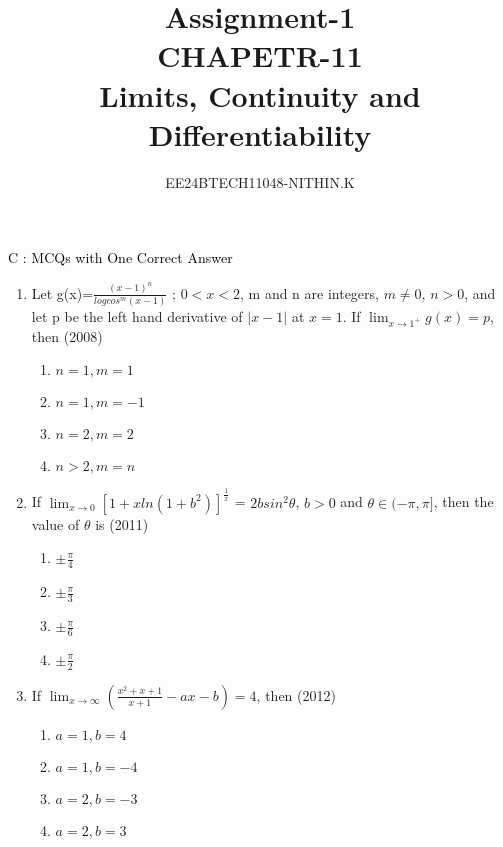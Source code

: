\documentclass[journal,12pt,twocolumn]{IEEEtran}
\theoremstyle{remark}
\begin{document}


\title{Assignment-1\\CHAPETR-11\\Limits, Continuity and Differentiability}
\author{EE24BTECH11048-NITHIN.K} 
\maketitle
\newpage
\bigskip

\renewcommand{\thefigure}{\theenumi}
\renewcommand{\thetable}{\theenumi}

\fontsize{14}{16}\selectfont
\textcolor{black}{C : MCQs with One Correct Answer \\}


\begin{enumerate} 
\item Let g(x)=$\frac{(x-1)^n}{logcos^m(x-1)}$ ; $0<x<2$, m and n are integers, $m\neq0$, $n>0$, and let p be the left hand derivative of $|x-1|$ at $x=1$. If $\lim_{x \to 1^+}{g(x)=p}$, then \hfill{(2008)} \\  

\begin{enumerate}[label=\alph*)]
    \item $n=1,m=1$
    \item $n=1,m=-1$
    \item $n=2,m=2$
    \item $n>2,m=n$
\end{enumerate}

\item If $\lim_{x \to 0}[1+xln(1+b^2)]^\frac{1}{x}$ = $2bsin^2\theta$, $b>0$ and $\theta \in (-\pi,\pi]$, then the value of $\theta$ is 
\hfill{(2011)} \\

\begin{enumerate}[label=\alph*)]
    \item $\pm\frac{\pi}{4}$
    \item $\pm\frac{\pi}{3}$
    \item $\pm\frac{\pi}{6}$
    \item $\pm\frac{\pi}{2}$
\end{enumerate} 

\item If $\lim_{ x \to \infty}\left(\frac{x^2+x+1}{x+1}-ax-b\right) = 4$, then \hfill{(2012)} \\


\begin{enumerate}[label=\alph*)]
    \item $a=1,b=4$
    \item $a=1,b=-4$
    \item $a=2,b=-3$
    \item $a=2,b=3$
\end{enumerate}



\end{enumerate}
\end{document}
